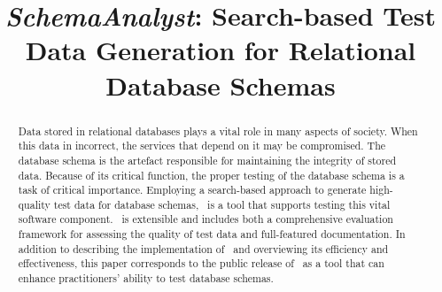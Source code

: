 \documentclass[conference]{IEEEtran}
\begin{document}
\title{\textit{SchemaAnalyst}: Search-based Test Data Generation for Relational Database Schemas}

\author{
\and
{}
}
\maketitle

\begin{abstract}

Data stored in relational databases plays a vital role in many aspects of society.  When this data in incorrect, the
services that depend on it may be compromised.  The database schema is the artefact responsible for maintaining the
integrity of stored data. Because of its critical function, the proper testing of the database schema is a task of
critical importance. Employing a search-based approach to generate high-quality test data for database schemas, \sa~is a
tool that supports testing this vital software component. \sa~is extensible and includes both a comprehensive evaluation
framework for assessing the quality of test data and full-featured documentation. In addition to describing the
implementation of \sa~and overviewing its efficiency and effectiveness, this paper corresponds to the public release of
\sa~as a tool that can enhance practitioners' ability to test database schemas.

\end{abstract}

\vspace*{-.05in}










\end{document}
